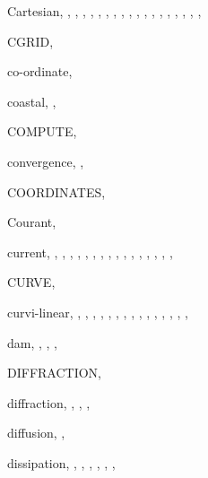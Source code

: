 \documentclass[12pt]{book}
\begin{document}
\begin{theindex}
  \item Cartesian, , , ,
		, , ,
		, , ,
		, , ,
		, , ,
		, , ,
  \item CGRID, 
  \item co-ordinate, 
  \item coastal, , 
  \item COMPUTE, 
  \item convergence, , 
  \item COORDINATES, 
  \item Courant, 
  \item current, , , ,
		, , ,
		, , ,
		, , ,
		, , ,
		, 
  \item CURVE, 
  \item curvi-linear, , , ,
		, , ,
		, , ,
		, , ,
		, , ,

  \indexspace

  \item dam, , , ,
  \item DIFFRACTION, 
  \item diffraction, , , ,
  \item diffusion, , 
  \item dissipation, , ,
		, , ,
		, 

  \indexspace


\end{theindex}
\end{document}
